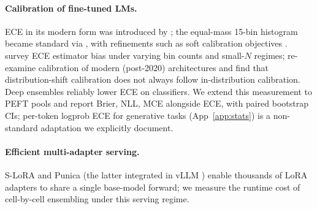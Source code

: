 \documentclass[11pt]{article}
\begin{document}
\paragraph{Calibration of fine-tuned LMs.} ECE in its modern form was introduced by \citet{naeini2015}; the equal-mass 15-bin histogram became standard via \citet{guo2017calibration}, with refinements such as soft calibration objectives \citep{karandikar2021soft}. \citet{nixon2019} survey ECE estimator bias under varying bin counts and small-$N$ regimes; \citet{minderer2021} re-examine calibration of modern (post-2020) architectures and find that distribution-shift calibration does not always follow in-distribution calibration. Deep ensembles \citep{lakshminarayanan2017simple} reliably lower ECE on classifiers. We extend this measurement to PEFT pools and report Brier, NLL, MCE alongside ECE, with paired bootstrap CIs; per-token logprob ECE for generative tasks (App~\ref{app:stats}) is a non-standard adaptation we explicitly document.

\paragraph{Efficient multi-adapter serving.} S-LoRA \citep{sheng2024slora} and Punica \citep{chen2024punica} (the latter integrated in vLLM \citep{kwon2023efficient}) enable thousands of LoRA adapters to share a single base-model forward; we measure the runtime cost of cell-by-cell ensembling under this serving regime.
\end{document}
